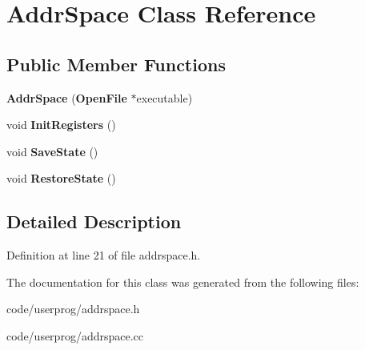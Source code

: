 \section{Addr\+Space Class Reference}
\label{class_addr_space}
\subsection*{Public Member Functions}
\begin{DoxyCompactItemize}
\item 
{\bfseries Addr\+Space} ({\bf Open\+File} $\ast$executable)\label{class_addr_space_a92150df1034dc2faa393f7b9bcef8851}

\item 
void {\bfseries Init\+Registers} ()\label{class_addr_space_ab0eb6814961508ac27437b235a9296fc}

\item 
void {\bfseries Save\+State} ()\label{class_addr_space_afbdfe878dfdbc45c3fd0712ba49ebc68}

\item 
void {\bfseries Restore\+State} ()\label{class_addr_space_ac874975e4df82801d99588c35ea8252a}

\end{DoxyCompactItemize}


\subsection{Detailed Description}


Definition at line 21 of file addrspace.\+h.



The documentation for this class was generated from the following files\+:\begin{DoxyCompactItemize}
\item 
code/userprog/addrspace.\+h\item 
code/userprog/addrspace.\+cc\end{DoxyCompactItemize}
